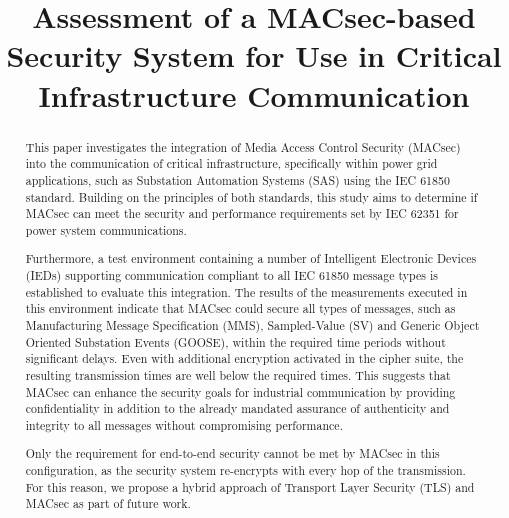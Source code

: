 \documentclass[conference, onecolumn, a4paper]{IEEEtran}
\begin{document}
\title{Assessment of a MACsec-based Security System for Use in Critical Infrastructure Communication}

\author{
    \vspace{6 pt}
}

\maketitle

\begin{abstract}
    \noindent This paper investigates the integration of Media Access Control Security (MACsec) into the communication of critical infrastructure, 
    specifically within power grid applications, such as Substation Automation Systems (SAS) using the IEC 61850 standard. Building on the principles 
    of both standards, this study aims to determine if MACsec can meet the security and performance requirements set by IEC 62351 for power system 
    communications.
    
    \smallskip
    \noindent Furthermore, a  test environment containing a number of Intelligent Electronic Devices (IEDs) supporting communication compliant to all 
    IEC 61850 message types is established to evaluate this integration. The results of the measurements executed in this environment indicate that 
    MACsec could secure all types of messages, such as Manufacturing Message Specification (MMS), Sampled-Value (SV) and Generic Object Oriented 
    Substation Events (GOOSE), within the required time periods without significant delays. Even with additional encryption activated in the cipher suite, 
    the resulting transmission times are well below the required times. This suggests that MACsec can enhance the security goals for industrial 
    communication by providing confidentiality in addition to the already mandated assurance of authenticity and integrity to all messages without 
    compromising performance.

    \smallskip
    \noindent Only the requirement for end-to-end security cannot be met by MACsec in this configuration, as the security system re-encrypts with every 
    hop of the transmission. For this reason, we propose a hybrid approach of Transport Layer Security (TLS) and MACsec as part of future work. 
\end{abstract}
\end{document}
